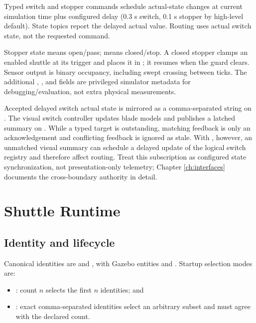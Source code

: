 Typed switch and stopper commands schedule actual-state changes at current
simulation time plus configured delay (0.3 s switch, 0.1 s stopper by high-level
default). State topics report the delayed actual value. Routing uses actual
switch state, not the requested command.

Stopper state  means open/pass;  means closed/stop. A closed
stopper clamps an enabled shuttle at its trigger and places it in
; it resumes when the guard clears. Sensor output is binary
occupancy, including swept crossing between ticks. The additional
, , and  fields are privileged simulator
metadata for debugging/evaluation, not extra physical measurements.

Accepted delayed switch actual state is mirrored as a comma-separated
 string on
. The visual switch controller updates blade
models and publishes a latched summary on
. While a typed target is outstanding,
matching feedback is only an acknowledgement and conflicting feedback is
ignored as stale. With , however, an
unmatched visual summary can schedule a delayed update of the logical switch
registry and therefore affect routing. Treat this subscription as configured
state synchronization, not presentation-only telemetry; Chapter
\ref{ch:interfaces} documents the cross-boundary authority in detail.

\section{Shuttle Runtime}

\subsection{Identity and lifecycle}

Canonical identities are  and , with Gazebo entities
 and
. Startup selection modes are:

\begin{itemize}
  \item {}: count $n$ selects the first $n$ identities; and
  \item {}: exact comma-separated identities select an arbitrary
        subset and must agree with the declared count.
\end{itemize}

